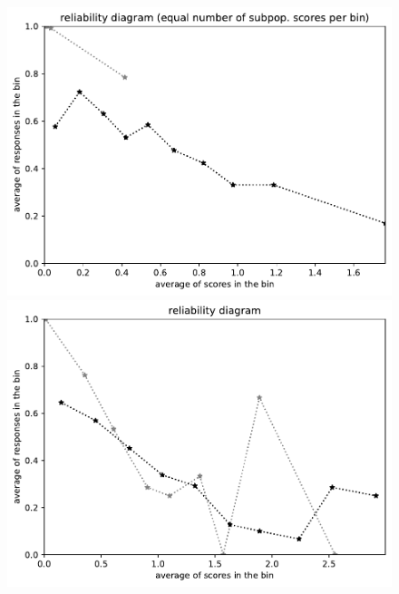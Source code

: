 \documentclass{article}
\newlength{\vertsep}
\newlength{\imsize}
\begin{document}
\begin{figure}
\begin{centering}
\parbox{\imsize}{\includegraphics[width=\imsize]
{../codes/unweighted/nll-1-60-night-snake-Hypsiglena-torquata_323-monarch-monarch-butterfly-milkweed-butterfly-Danaus-plexippusequisamps10.pdf}}
\quad\quad
\parbox{\imsize}{\includegraphics[width=\imsize]
{../codes/unweighted/nll-1-60-night-snake-Hypsiglena-torquata_323-monarch-monarch-butterfly-milkweed-butterfly-Danaus-plexippusequiscore10.pdf}}

\vspace{\vertsep}


\end{centering}
\end{figure}
\end{document}
